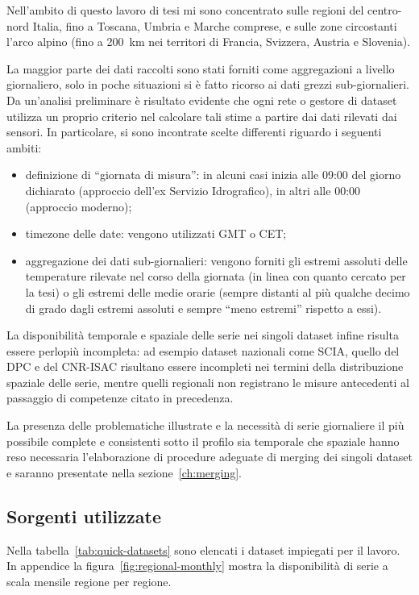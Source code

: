 Nell'ambito di questo lavoro di tesi mi sono concentrato sulle regioni del centro-nord Italia, fino a Toscana, Umbria e Marche comprese, e sulle zone circostanti l'arco alpino (fino a \qty{200}{\kilo\meter} nei territori di Francia, Svizzera, Austria e Slovenia).

La maggior parte dei dati raccolti sono stati forniti come aggregazioni a livello giornaliero, solo in poche situazioni si è fatto ricorso ai dati grezzi sub-giornalieri. Da un'analisi preliminare è risultato evidente che ogni rete o gestore di dataset utilizza un proprio criterio nel calcolare tali stime a partire dai dati rilevati dai sensori. In particolare, si sono incontrate scelte differenti riguardo i seguenti ambiti:

\begin{itemize}
  \item
    definizione di ``giornata di misura'': in alcuni casi inizia alle 09:00 del giorno dichiarato (approccio dell'ex Servizio Idrografico), in altri alle 00:00 (approccio moderno);
  \item
    timezone delle date: vengono utilizzati GMT o CET;
  \item
    aggregazione dei dati sub-giornalieri: vengono forniti gli estremi assoluti delle temperature rilevate nel corso della giornata (in linea con quanto cercato per la tesi) o gli estremi delle medie orarie (sempre distanti al più qualche decimo di grado dagli estremi assoluti e sempre ``meno estremi'' rispetto a essi).
\end{itemize}

La disponibilità temporale e spaziale delle serie nei singoli dataset infine risulta essere perlopiù incompleta: ad esempio dataset nazionali come SCIA, quello del DPC e del CNR-ISAC risultano essere incompleti nei termini della distribuzione spaziale delle serie, mentre quelli regionali non registrano le misure antecedenti al passaggio di competenze citato in precedenza.

La presenza delle problematiche illustrate e la necessità di serie giornaliere il più possibile complete e consistenti sotto il profilo sia temporale che spaziale hanno reso necessaria l'elaborazione di procedure adeguate di merging dei singoli dataset e saranno presentate nella sezione~\ref{ch:merging}.

\subsection{Sorgenti utilizzate}\label{ch:sources}
Nella tabella~\ref{tab:quick-datasets} sono elencati i dataset impiegati per il lavoro. In appendice la figura~\ref{fig:regional-monthly} mostra la disponibilità di serie a scala mensile regione per regione.

